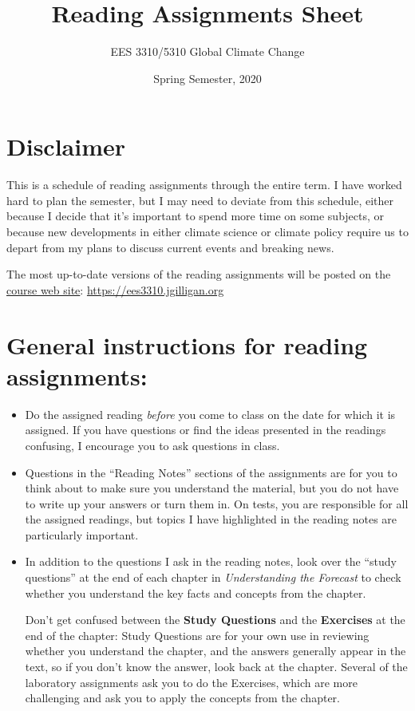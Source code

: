 \documentclass[
]{article}
\title{Reading Assignments Sheet}
\author{EES 3310/5310 Global Climate Change}
\date{Spring Semester, 2020}
\begin{document}
\maketitle

\hypertarget{disclaimer}{%
\section{Disclaimer}\label{disclaimer}}

This is a schedule of reading assignments through the entire term. I
have worked hard to plan the semester, but I may need to deviate from
this schedule, either because I decide that it's important to spend more
time on some subjects, or because new developments in either climate
science or climate policy require us to depart from my plans to discuss
current events and breaking news.

The most up-to-date versions of the reading assignments will be posted
on the \href{https://ees3310.jgilligan.org}{course web site}:
\url{https://ees3310.jgilligan.org}

\hypertarget{general-instructions-for-reading-assignments}{%
\section{General instructions for reading
assignments:}\label{general-instructions-for-reading-assignments}}

\begin{itemize}
\item
  Do the assigned reading \emph{before} you come to class on the date
  for which it is assigned. If you have questions or find the ideas
  presented in the readings confusing, I encourage you to ask questions
  in class.
\item
  Questions in the ``Reading Notes'' sections of the assignments are for
  you to think about to make sure you understand the material, but you
  do not have to write up your answers or turn them in. On tests, you
  are responsible for all the assigned readings, but topics I have
  highlighted in the reading notes are particularly important.
\item
  In addition to the questions I ask in the reading notes, look over the
  ``study questions'' at the end of each chapter in \emph{Understanding
  the Forecast} to check whether you understand the key facts and
  concepts from the chapter.

  Don't get confused between the \textbf{Study Questions} and the
  \textbf{Exercises} at the end of the chapter: Study Questions are for
  your own use in reviewing whether you understand the chapter, and the
  answers generally appear in the text, so if you don't know the answer,
  look back at the chapter. Several of the laboratory assignments ask
  you to do the Exercises, which are more challenging and ask you to
  apply the concepts from the chapter.
\end{itemize}
\end{document}
